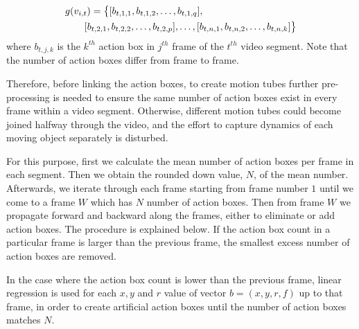 \begin{equation}
\label{eqn:action box}
\begin{split}
\MoveEqLeft
 g(v_{i,t}) = \big\{[b_{t,1,1},b_{t,1,2},\dots,b_{t,1,q}],\\
 & [b_{t,2,1},b_{t,2,2},\dots,b_{t,2,p}],\dots,[b_{t,n,1},b_{t,n,2},\dots,b_{t,n,k}]\big\}
\end{split}
\end{equation}
where $b_{t,j,k}$ is the $k^{th}$ action box in $j^{th}$ frame of the $t^{th}$ video segment. Note that the number of
action boxes differ from frame to frame.

Therefore, before linking the action boxes, to create motion tubes further pre-processing is needed to ensure the same number of action
boxes exist in every frame within a video segment. Otherwise, different motion tubes could become joined halfway through the video, and the
effort to capture dynamics of each moving object separately is disturbed.

For this purpose, first we calculate the mean number of action boxes per frame in each segment. Then we obtain the rounded down value, $N$, of the mean number. Afterwards, we iterate through each frame starting from frame number $1$ until we come to a frame $W$ which has $N$ number of action boxes. Then from frame $W$ we propagate forward and backward along the frames, either to eliminate or add action boxes. The procedure is explained below. If the action box count in a particular frame is larger than the previous frame, the smallest excess number of action boxes are removed. %

In the case where the action box count is lower than the previous frame, linear regression %
is used for each $x,y$ and $r$ value of vector $b = (x,y,r,f)$
up to that frame, in order to create artificial action boxes until the number of action boxes matches $N$.



